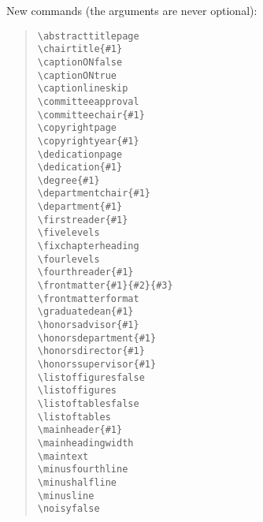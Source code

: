 \noindent New commands (the arguments are never optional):

\begin{quote}
\verb|\abstracttitlepage| \\
\verb|\chairtitle{#1}| \\
\verb|\captionONfalse| \\
\verb|\captionONtrue| \\
\verb|\captionlineskip| \\
\verb|\committeeapproval| \\
\verb|\committeechair{#1}| \\
\verb|\copyrightpage| \\
\verb|\copyrightyear{#1}| \\
\verb|\dedicationpage| \\
\verb|\dedication{#1}| \\
\verb|\degree{#1}| \\
\verb|\departmentchair{#1}| \\
\verb|\department{#1}| \\
\verb|\firstreader{#1}| \\
\verb|\fivelevels| \\
\verb|\fixchapterheading| \\
\verb|\fourlevels| \\
\verb|\fourthreader{#1}| \\
\verb|\frontmatter{#1}{#2}{#3}| \\
\verb|\frontmatterformat| \\
\verb|\graduatedean{#1}| \\
\verb|\honorsadvisor{#1}| \\
\verb|\honorsdepartment{#1}| \\
\verb|\honorsdirector{#1}| \\
\verb|\honorssupervisor{#1}| \\
\verb|\listoffiguresfalse| \\
\verb|\listoffigures| \\
\verb|\listoftablesfalse| \\
\verb|\listoftables| \\
\verb|\mainheader{#1}| \\
\verb|\mainheadingwidth| \\
\verb|\maintext| \\
\verb|\minusfourthline| \\
\verb|\minushalfline| \\
\verb|\minusline| \\
\verb|\noisyfalse| \\

\end{quote}
